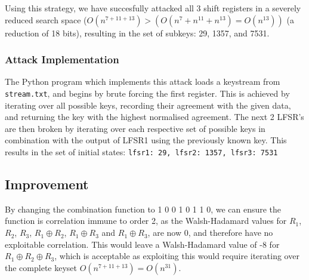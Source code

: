 \documentclass[british,11pt,a4paper]{article}
\begin{document}
Using this strategy, we have succesfully attacked all 3 shift registers in a severely reduced search space (\(O(n^{7+11+13})>(O(n^{7}+n^{11}+n^{13})=O(n^{13}))\) (a reduction of 18 bits), resulting in the set of subkeys: 29, 1357, and 7531.

\subsubsection{Attack Implementation}
The Python program which implements this attack loads a keystream from \lstinline{stream.txt}, and begins by brute forcing the first register.
This is achieved by iterating over all possible keys, recording their agreement with the given data, and returning the key with the highest normalised agreement.
The next 2 LFSR's are then broken by iterating over each respective set of possible keys in combination with the output of LFSR1 using the previously known key.
This results in the set of initial states: \lstinline{lfsr1: 29, lfsr2: 1357, lfsr3: 7531}

\subsection{Improvement}
By changing the combination function to 1 0 0 1 0 1 1 0, we can ensure the function
is correlation immune to order 2, as the Walsh-Hadamard values for \(R_1\),
 \(R_2\),  \(R_3\),  \(R_1 \oplus R_2\), \(R_1 \oplus R_3\) and \(R_1 \oplus R_3\), are now 0,
 and therefore have no exploitable correlation. This would leave a Walsh-Hadamard value of
 -8 for \(R_1 \oplus R_2 \oplus R_3\), which is acceptable as exploiting this would require iterating over the complete keyset \(O(n^{7+11+13}) = O(n^{31})\).
\end{document}
